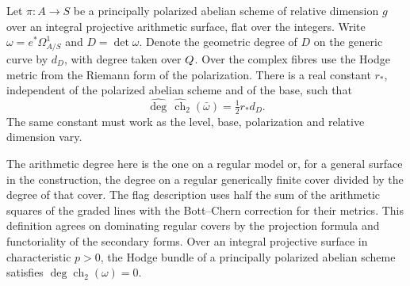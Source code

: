 \begin{theorem}\label{thm:hodge-surface-degree}
Let \(\pi:A\to S\) be a principally polarized abelian scheme of
relative dimension \(g\) over an integral projective arithmetic
surface, flat over the integers. Write \(\omega=e^*\Omega^1_{A/S}\)
and \(D=\det\omega\). Denote the geometric degree of \(D\) on
the generic curve by \(d_D\), with degree taken over \(Q\).
Over the complex fibres use the Hodge metric from the Riemann
form of the polarization. There is a real constant \(r_*\), independent of the polarized
abelian scheme and of the base, such that
\begin{equation}\label{eq:hodge-surface-degree}
   \widehat{\deg}\,\widehat{\operatorname{ch}}_2(\bar\omega)
                  =\tfrac12 r_*d_D .
\end{equation}
The same constant must work as the level, base, polarization
and relative dimension vary.

The arithmetic degree here is
the one on a regular model or, for a general surface in the
construction, the degree on a regular generically finite cover
divided by the degree of that cover. The flag description uses
half the sum of the arithmetic squares of the graded lines with
the Bott--Chern correction for their metrics. This definition
agrees on dominating regular covers by the projection formula
and functoriality of the secondary forms. Over an integral projective surface in characteristic \(p>0\),
the Hodge bundle of a principally polarized abelian scheme
satisfies \(\deg\operatorname{ch}_2(\omega)=0\). \label{cor:hodge-surface-degree-1}
\end{theorem}

